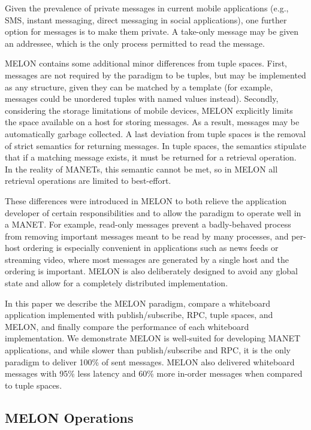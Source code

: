 \documentclass{llncs}
\begin{document}
Given the prevalence of private messages in current mobile applications (e.g., SMS, instant messaging, direct messaging in social applications), one further option for messages is to make them private. A take-only message may be given an addressee, which is the only process permitted to read the message.

MELON contains some additional minor differences from tuple spaces. First, messages are not required by the paradigm to be tuples, but may be implemented as any structure, given they can be matched by a template (for example, messages could be unordered tuples with named values instead). Secondly, considering the storage limitations of mobile devices, MELON explicitly limits the space available on a host for storing messages. As a result, messages may be automatically garbage collected. A last deviation from tuple spaces is the removal of strict semantics for returning messages. In tuple spaces, the semantics stipulate that if a matching message exists, it must be returned for a retrieval operation. In the reality of MANETs, this semantic cannot be met, so in MELON all retrieval operations are limited to best-effort.

These differences were introduced in MELON to both relieve the application developer of certain responsibilities and to allow the paradigm to operate well in a MANET. For example, read-only messages prevent a badly-behaved process from removing important messages meant to be read by many processes, and per-host ordering is especially convenient in applications such as news feeds or streaming video, where most messages are generated by a single host and the ordering is important. MELON is also deliberately designed to avoid any global state and allow for a completely distributed implementation.

In this paper we describe the MELON paradigm, compare a whiteboard application implemented with publish/subscribe, RPC, tuple spaces, and MELON, and finally compare the performance of each whiteboard implementation. We demonstrate MELON is well-suited for developing MANET applications, and while slower than publish/subscribe and RPC, it is the only paradigm to deliver 100\% of sent messages. MELON also delivered whiteboard messages with 95\% less latency and 60\% more in-order messages when compared to tuple spaces.

\subsection{MELON Operations}
\end{document}
